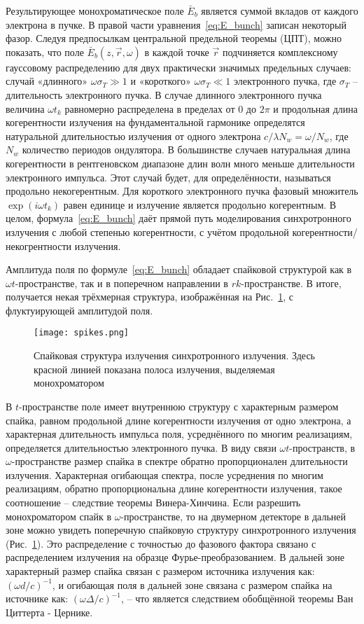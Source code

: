 Результирующее монохроматическое поле $\bar{E}_{b}$ является суммой вкладов от каждого электрона в пучке. В правой части уравнения~\ref{eq:E_bunch} записан некоторый фазор. Следуя предпосылкам центральной предельной теоремы (ЦПТ), можно показать, что поле $\bar{E}_{b}(z, \vec{r}, \omega)$ в каждой точке $\vec{r}$ подчиняется комплексному гауссовому распределению для двух практически значимых предельных случаев: случай «длинного» $\omega\sigma_T \gg 1$ и «короткого»  $\omega\sigma_T \ll 1$ электронного пучка, где $\sigma_T$ -- длительность электронного пучка. В случае длинного электронного пучка величина $\omega t_k$ равномерно распределена в пределах от $0$ до $2\pi$ и продольная длина когерентности излучения на фундаментальной гармонике определятся натуральной длительностью излучения от одного электрона $c/\lambda N_w = \omega / N_w$, где $N_w$ количество периодов ондулятора. В большинстве случаев натуральная длина когерентности в рентгеновском диапазоне длин волн много меньше длительности электронного импульса. Этот случай будет, для определённости, называться продольно некогерентным. Для короткого электронного пучка фазовый множитель $\exp{(i \omega t_k)}$ равен единице и излучение является продольно когерентным. В целом, формула~\ref{eq:E_bunch} даёт прямой путь моделирования синхротронного излучения с любой степенью когерентности, с учётом продольной когерентности/некогрентности излучения.

Амплитуда поля по формуле~\ref{eq:E_bunch} обладает спайковой структурой как в $\omega t$-пространстве, так и в поперечном направлении в $rk$-пространстве. В итоге, получается некая трёхмерная структура, изображённая на Рис.~\ref{fig:spikes}, с флуктуирующей амплитудой поля. 
\begin{figure}[H]
	\centering 	\texttt{[image: spikes.png]}
	\caption{Спайковая структура излучения синхротронного излучения. Здесь красной линией показана полоса излучения, выделяемая монохроматором}
	\label{fig:spikes}
\end{figure}
\noindent В $t$-пространстве поле имеет внутреннюю структуру с характерным размером спайка, равном продольной длине когерентности излучения от одно электрона, а характерная длительность импульса поля, усреднённого по многим реализациям, определяется длительностью электронного пучка. В виду связи $\omega t$-пространств, в $\omega$-пространстве размер спайка в спектре обратно пропорционален длительности излучения. Характерная огибающая спектра, после усреднения по многим реализациям, обратно пропорциональна длине когерентности излучения, такое соотношение -- следствие теоремы Винера-Хинчина. Если разрешить монохроматором спайк в $\omega$-пространстве, то на двумерном детекторе в дальней зоне можно увидеть поперечную спайковую структуру синхротронного излучения (Рис.~\ref{fig:spikes}). Это распределение с точностью до фазового фактора связано с распределением излучения на образце Фурье-преобразованием. В дальней зоне характерный размер спайка связан с размером источника излучения как:  $(\omega d /c)^{-1}$, и огибающая поля в дальней зоне связана с размером спайка на источнике как: $(\omega \Delta /c)^{-1}$, -- что является следствием обобщённой теоремы Ван Циттерта - Цернике. 


\newpage






